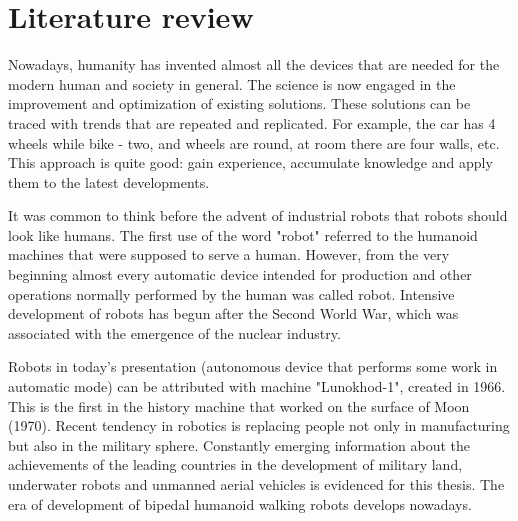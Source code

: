 \documentclass[11pt,a4paper]{article}
\begin{document}
\newpage

\section{Literature review}
Nowadays, humanity has invented almost all the devices that are needed for the modern human and society in general. The science is now engaged in the improvement and optimization of existing solutions. These solutions can be traced with trends that are repeated and replicated. For example, the car has 4 wheels while bike - two, and wheels are round, at room there are four walls, etc. This approach is quite good: gain experience, accumulate knowledge and apply them to the latest developments.

It was common to think before the advent of industrial robots that robots should look like humans. The first use of the word "robot" referred to the humanoid machines that were supposed to serve a human. However, from the very beginning almost every automatic device intended for production and other operations normally performed by the human was called robot. Intensive development of robots has begun after the Second World War, which was associated with the emergence of the nuclear industry.

Robots in today's presentation (autonomous device that performs some work in automatic mode) can be attributed with machine "Lunokhod-1", created in 1966. This is the first in the history machine that worked on the surface of Moon (1970). Recent tendency in robotics is replacing people not only in manufacturing but also in the military sphere. Constantly emerging information about the achievements of the leading countries in the development of military land, underwater robots and unmanned aerial vehicles is evidenced for this thesis. The era of development of  bipedal humanoid walking robots develops nowadays.
\end{document}
